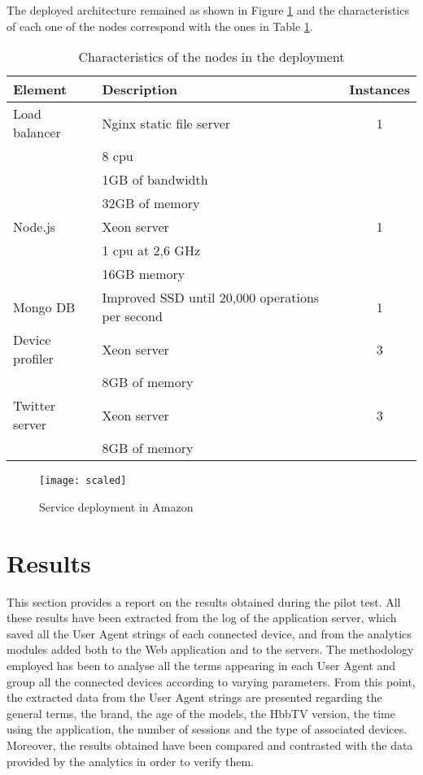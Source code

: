 The deployed architecture remained as shown in Figure \ref{fig:scaled} and the characteristics of each one of the nodes correspond with the ones in Table \ref{tab:deployment}.
\begin{table}
	\begin{center}
		\caption{Characteristics of the nodes in the deployment}\label{tab:deployment}
		\begin{tabular}{||l|p{4cm}|c||}
			\hline
			Element & Description & Instances\\
			\hline
			Load balancer & 
			Nginx static file server & 1 \\ 	
			& 8 cpu & \\
			& 1GB of bandwidth & \\
			& 32GB of memory 	&\\
			
			\hline
			Node.js & 
			Xeon server & 1 \\
			& 1 cpu at 2,6 GHz & \\
			& 16GB memory & \\
			\hline
			Mongo DB &  
			Improved SSD until 20,000 operations per second
			& 1\\
			\hline
			Device profiler & 
			Xeon server & 3\\
			& 8GB of memory & \\			
			\hline
			Twitter server & 
			Xeon server & 3 \\
			& 8GB of memory	& \\	 
			\hline
			
		\end{tabular}
	\end{center}
\end{table}
\begin{figure}	
	\texttt{[image: scaled]}
	\caption{Service deployment in Amazon}
	\label{fig:scaled}
\end{figure}

\section{Results}\label{results}
This section provides a report on the results obtained during the pilot test. All these results have been extracted from the log of the application server, which saved all the User Agent strings of each connected device, and from the analytics modules added both to the Web application and to the servers. The methodology employed has been to analyse all the terms appearing in each User Agent and group all the connected devices according to varying parameters. From this point, the extracted data from the User Agent strings are presented regarding the general terms, the brand, the age of the models, the HbbTV version, the time using the application, the number of sessions and the type of associated devices. Moreover, the results obtained have been compared and contrasted with the data provided by the analytics in order to verify them.  

